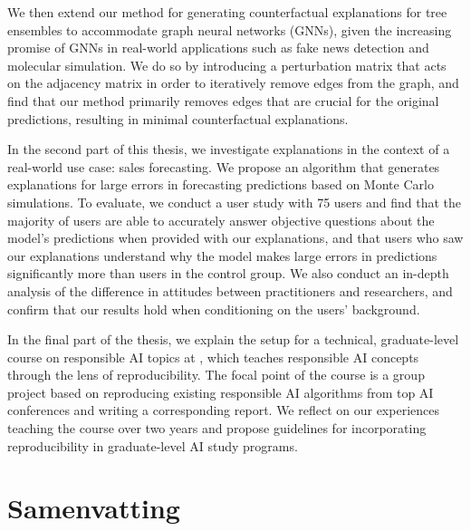 We then extend our method for generating counterfactual explanations for tree ensembles to accommodate graph neural networks (GNNs), given the increasing promise of GNNs in real-world applications such as fake news detection and molecular simulation. 
We do so by introducing a perturbation matrix that acts on the adjacency matrix in order to iteratively remove edges from the graph, and find that our method primarily removes edges that are crucial for the original predictions, resulting in minimal counterfactual explanations. 

In the second part of this thesis, we investigate explanations in the context of a real-world use case: sales forecasting. 
We propose an algorithm that generates explanations for large errors in forecasting predictions based on Monte Carlo simulations. 
To evaluate, we conduct a user study with 75 users and find that
the majority of users are able to accurately answer objective questions about the model's predictions when provided with our explanations, and that users who saw our explanations understand why the model makes large errors in predictions significantly more than users in the control group. 
We also conduct an in-depth analysis of the difference in attitudes between practitioners and researchers, and confirm that our results hold when conditioning on the users' background. 

In the final part of the thesis, we explain the setup for a technical, graduate-level course on responsible AI topics at \OurUniversity{}, which teaches responsible AI concepts through the lens of reproducibility. 
The focal point of the course is a group project based on reproducing existing responsible AI algorithms from top AI conferences and writing a corresponding report. 
We reflect on our experiences teaching the course over two years and propose guidelines for incorporating reproducibility in graduate-level AI study programs. 


\chapter*{Samenvatting}

